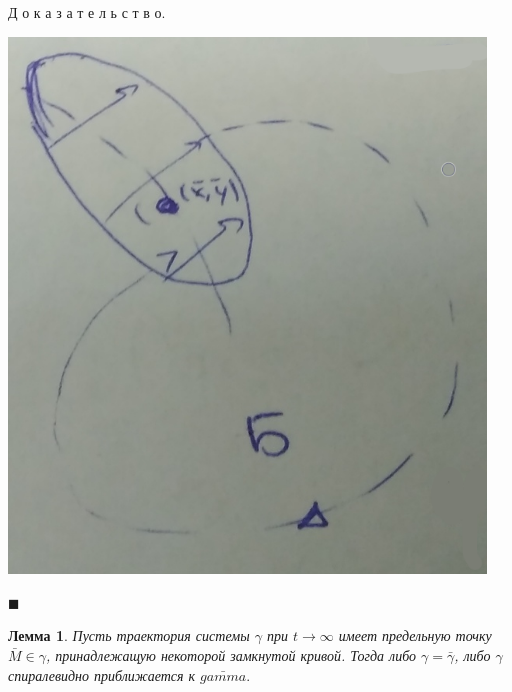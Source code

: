 \documentclass[oneside, final, 12pt]{article}
\theoremstyle{def}
\theoremstyle{th}
\newtheorem{lemma}{Лемма}[section]
\theoremstyle{rem}
\renewenvironment{proof}{\par Д о к а з а т е л ь с т в о.}{\hfill$\blacksquare$}
\numberwithin{figure}{section}
\numberwithin{equation}{section}
\begin{document}
\begin{proof}
\begin{itemize}
\begin{minipage}{0.24\textwidth}
				\begin{center} \includegraphics[width=0.95\textwidth]{pict/pict_9_2.png} \vspace{5mm}\end{center} 
			\end{minipage}
				
		\end{itemize}		
		
	\end{proof}
	\noindent
	\begin{lemma}
		Пусть траектория системы $\gamma$ при $t\rightarrow \infty$ имеет предельную точку $\bar{M}\in\gamma$, 
		принадлежащую некоторой замкнутой кривой. Тогда либо $\gamma = \bar{\gamma}$, либо $\gamma$ 
		спиралевидно приближается к $\bar{gamma}.$
	\end{lemma}
\end{document}
